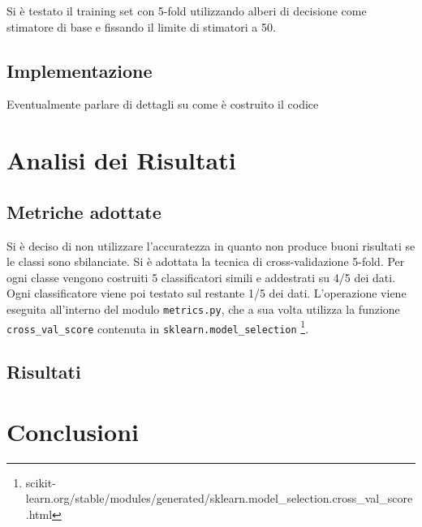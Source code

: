 \documentclass[12pt,a4paper,oneside,hidelinks]{report}
\begin{document}
Si è testato il training set con 5-fold utilizzando alberi di decisione come stimatore di base e fissando il limite di stimatori a 50.

\section{Implementazione}
Eventualmente parlare di dettagli su come è costruito il codice

\chapter{Analisi dei Risultati} \label{chap:risultati}

\section{Metriche adottate}
Si è deciso di non utilizzare l'accuratezza in quanto non produce buoni risultati se le classi sono sbilanciate.  
Si è adottata la tecnica di cross-validazione 5-fold. Per ogni classe vengono costruiti 5 classificatori simili e addestrati su 4/5 dei dati. Ogni classificatore viene poi testato sul restante 1/5 dei dati.
L'operazione viene eseguita all'interno del modulo \texttt{metrics.py}, 
che a sua volta utilizza la funzione \texttt{cross\_val\_score} contenuta in 
\texttt{sklearn.model\_selection} 
\footnote{scikit-learn.org/stable/modules/generated/sklearn.model\_selection.cross\_val\_score.html}. 

\section{Risultati}

\chapter{Conclusioni}
\end{document}
